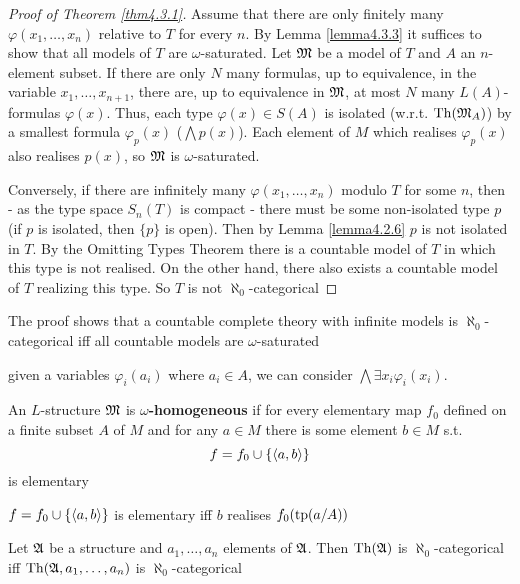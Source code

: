 \documentclass[11pt]{article}
\begin{document}
\begin{proof}[Proof of Theorem \ref{thm4.3.1}]
Assume that there are only finitely many \(\varphi(x_1,\dots,x_n)\) relative to
\(T\) for every \(n\). By Lemma \ref{lemma4.3.3} it suffices to show that all
models of \(T\) are \(\omega\)-saturated. Let \(\mathfrak{M}\) be a model of \(T\) and
\(A\) an \(n\)-element subset. If there are only \(N\) many formulas, up to
equivalence, in the variable \(x_1,\dots,x_{n+1}\), there are, up to
equivalence in \(\mathfrak{M}\), at most \(N\) many \(L(A)\)-formulas \(\varphi(x)\). Thus,
each type \(\varphi(x)\in S(A)\) is isolated (w.r.t. \(\operatorname{Th}(\mathfrak{M}_A)\)) by a smallest formula \(\varphi_p(x)\)
(\(\bigwedge p(x)\)). Each element of \(M\) which realises
\(\varphi_p(x)\) also realises \(p(x)\), so \(\mathfrak{M}\) is \(\omega\)-saturated.

Conversely, if there are infinitely many \(\varphi(x_1,\dots,x_n)\) modulo \(T\)
for some \(n\), then - as the type space \(S_n(T)\) is compact - there must
be some non-isolated type \(p\) (if \(p\) is isolated, then \(\{p\}\) is open). Then by Lemma
\ref{lemma4.2.6} \(p\) is not isolated in \(T\).
By the Omitting Types Theorem there is a
countable model of \(T\) in which this type is not realised. On the other
hand, there also exists a countable model of \(T\) realizing this type. So
\(T\) is not \(\aleph_0\)-categorical
\end{proof}

The proof shows that a countable complete theory with infinite models is
\(\aleph_0\)-categorical iff all countable models are \(\omega\)-saturated

given a variables \(\varphi_i(a_i)\) where \(a_i\in A\), we can consider \(\bigwedge\exists x_i\varphi_i(x_i)\).

\begin{definition}[]
An \(L\)-structure \(\mathfrak{M}\) is \textbf{\(\omega\)-homogeneous} if for every elementary
map \(f_0\) defined on a finite subset \(A\) of \(M\)  and for any \(a\in M\)
there is some element \(b\in M\) s.t.
\begin{equation*}
f=f_0\cup\{\langle a,b\rangle\}
\end{equation*}
is elementary
\end{definition}

\(f=f_0\cup\{\langle a,b\rangle\}\) is elementary iff \(b\) realises
\(f_0(\operatorname{tp}(a/A))\)

\begin{corollary}[]
Let \(\mathfrak{A}\) be a structure and \(a_1,\dots,a_n\) elements of \(\mathfrak{A}\). Then
\(\operatorname{Th}(\mathfrak{A})\) is \(\aleph_0\)-categorical iff \(\operatorname{Th}(\mathfrak{A},a_1,\dots,a_n)\) is \(\aleph_0\)-categorical
\end{corollary}
\end{document}
